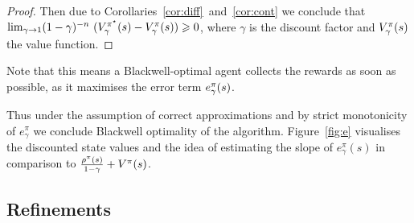 \documentclass[envcountsame]{llncs}
\begin{document}
\begin{proof}
  Then due to Corollaries~\ref{cor:diff}~and~\ref{cor:cont} we conclude that
  \(\lim_{\gamma \to 1}(1-\gamma)^{-n}\ (V_{\gamma}^{\pi^{\star}}(s) - V_{\gamma}^{\pi}(s)) \geqslant
  0\), where \(\gamma\) is the discount factor and \(V_{\gamma}^{\pi}(s)\) the value function.

\end{proof}

\begin{remark}
  Note that this means a Blackwell-optimal agent collects the rewards as soon as possible, as it
  maximises the error term \(e_{\gamma}^{\pi}(s)\).






\end{remark}

Thus under the assumption of correct approximations and by strict monotonicity of $e_{\gamma}^{\pi}$
we conclude Blackwell optimality of the algorithm. Figure~\ref{fig:e} visualises the discounted
state values and the idea of estimating the slope of $e_{\gamma}^{\pi}(s)$ in comparison to
$\frac{\rho^{\pi}(s)}{1-\gamma} + V^{\pi}(s)$.


\subsection{Refinements}
\label{subsec:Refinements}
\end{document}
